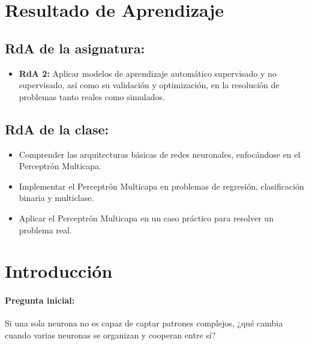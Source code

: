 \documentclass[a4,11pt]{aleph-notas}
\begin{document}
\encabezado

\section*{Resultado de Aprendizaje}

\subsection*{RdA de la asignatura:}
\begin{itemize}[leftmargin=*]
    \item \textbf{RdA 2:} Aplicar modelos de aprendizaje automático supervisado y no supervisado, así como su validación y optimización, en la resolución de problemas tanto reales como simulados.
\end{itemize}

\subsection*{RdA de la clase:}
\begin{itemize}[leftmargin=*]
    \item Comprender las arquitecturas básicas de redes neuronales, enfocándose en el Perceptrón Multicapa.
    \item Implementar el Perceptrón Multicapa en problemas de regresión, clasificación binaria y multiclase.
    \item Aplicar el Perceptrón Multicapa en un caso práctico para resolver un problema real.
\end{itemize}

\section*{Introducción}

\paragraph{Pregunta inicial:} 
Si una sola neurona no es capaz de captar patrones complejos, ¿qué cambia cuando varias neuronas se organizan y cooperan entre sí?
\end{document}
